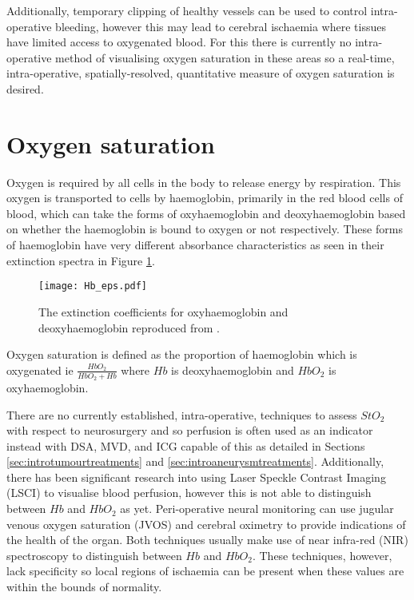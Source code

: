 Additionally, temporary clipping of healthy vessels can be used to control intra-operative bleeding, however this may lead to cerebral ischaemia where tissues have limited access to oxygenated blood\cite{Doron2022}. For this there is currently no intra-operative method of visualising oxygen saturation in these areas so a real-time, intra-operative, spatially-resolved, quantitative measure of oxygen saturation is desired. 

\section{Oxygen saturation}
Oxygen is required by all cells in the body to release energy by respiration. This oxygen is transported to cells by haemoglobin, primarily in the red blood cells of blood, which can take the forms of oxyhaemoglobin and deoxyhaemoglobin based on whether the haemoglobin is bound to oxygen or not respectively. These forms of haemoglobin have very different absorbance characteristics as seen in their extinction spectra in Figure \ref{fig:Haemoglobinext}. 
\begin{figure}[h]
    \centering 
    \texttt{[image: Hb\_eps.pdf]}
    \caption{The extinction coefficients for oxyhaemoglobin and deoxyhaemoglobin reproduced from \cite{Prahl1998}.}
    \label{fig:Haemoglobinext}
\end{figure}
Oxygen saturation is defined as the proportion of haemoglobin which is oxygenated ie $\frac{HbO_2}{HbO_2 + Hb}$ where $Hb$ is deoxyhaemoglobin and $HbO_2$ is oxyhaemoglobin. 

There are no currently established, intra-operative, techniques to assess $StO_2$ with respect to neurosurgery and so perfusion is often used as an indicator instead with DSA, MVD, and ICG capable of this as detailed in Sections \ref{sec:introtumourtreatments} and \ref{sec:introaneurysmtreatments}. Additionally, there has been significant research into using Laser Speckle Contrast Imaging (LSCI) to visualise blood perfusion, however this is not able to distinguish between $Hb$ and $HbO_2$ as yet\cite{Dunn2012, Zhong2021}. Peri-operative neural monitoring can use jugular venous oxygen saturation (JVOS)\cite{Raith2020} and cerebral oximetry\cite{Lian2020} to provide indications of the health of the organ. Both techniques usually make use of near infra-red (NIR) spectroscopy to distinguish between $Hb$ and $HbO_2$. These techniques, however, lack specificity so local regions of ischaemia can be present when these values are within the bounds of normality\cite{Raith2020, Zhong2021}.

